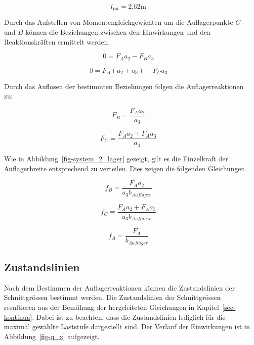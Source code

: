 \documentclass[
  12pt,
  letterpaper,
  egregdoesnotlikesansseriftitles]{scrreprt}
\begin{document}
\begin{equation}l_{tot} = 2.62 \text{m}\end{equation}

Durch das Aufstellen von Momentengleichgewichten um die Auflagerpunkte
\(C\) und \(B\) können die Beziehungen zwischen den Einwirkungen und den
Reaktionskräften ermittelt werden.

\begin{equation}0 = F_{A} a_{2} - F_{B} a_{3}\end{equation}

\begin{equation}0 = F_{A} \left(a_{2} + a_{3}\right) - F_{C} a_{3}\end{equation}

Durch das Auflösen der bestimmten Beziehungen folgen die
Auflagerreaktionen zu:

\begin{equation}F_{B} = \frac{F_{A} a_{2}}{a_{3}}\end{equation}

\begin{equation}F_{C} = \frac{F_{A} a_{2} + F_{A} a_{3}}{a_{3}}\end{equation}

Wie in Abbildung~\ref{fig-system_2_lager} gezeigt, gilt es die
Einzelkraft der Auflagerbreite entsprechend zu verteilen. Dies zeigen
die folgenden Gleichungen.

\begin{equation}f_{B} = \frac{F_{A} a_{2}}{a_{3} b_{Auflager}}\end{equation}

\begin{equation}f_{C} = \frac{F_{A} a_{2} + F_{A} a_{3}}{a_{3} b_{Auflager}}\end{equation}

\begin{equation}f_{A} = \frac{F_{A}}{b_{Auflager}}\end{equation}

\hypertarget{zustandslinien}{%
\subsection{Zustandslinien}\label{zustandslinien}}

Nach dem Bestimmen der Auflagerreaktionen können die Zustandslinien der
Schnittgrössen bestimmt werden. Die Zustandslinien der Schnittgrössen
resultieren aus der Bemühung der hergeleiteten Gleichungen in
Kapitel~\ref{sec-kontinua}. Dabei ist zu beachten, dass die
Zustandslinien lediglich für die maximal gewählte Laststufe dargestellt
sind. Der Verlauf der Einwirkungen ist in Abbildung~\ref{fig-q_x}
aufgezeigt.
\end{document}
